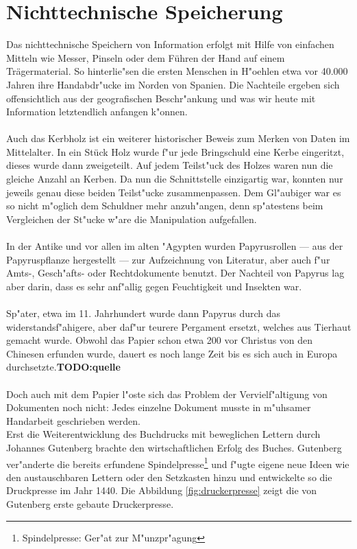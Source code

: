 
\chapter{Nichttechnische Speicherung}
\label{ch:Nichttechnische Speicherung}
Das nichttechnische Speichern von Information erfolgt mit Hilfe von einfachen Mitteln wie Messer, Pinseln oder dem Führen der Hand auf einem Trägermaterial. So hinterlie"sen die ersten Menschen in H"oehlen etwa vor 40.000 Jahren ihre Handabdr"ucke im Norden von Spanien\cite{spiegel:hoehle}. Die Nachteile ergeben sich offensichtlich aus der geografischen Beschr"ankung und was wir heute mit Information letztendlich anfangen k"onnen.
\\
\\
Auch das Kerbholz ist ein weiterer historischer Beweis zum Merken von Daten im Mittelalter. In ein Stück Holz wurde f"ur jede Bringschuld eine Kerbe eingeritzt, dieses wurde dann zweigeteilt. Auf jedem Teilst"uck des Holzes waren nun die gleiche Anzahl an Kerben. Da nun die Schnittstelle einzigartig war, konnten nur jeweils genau diese beiden Teilst"ucke zusammenpassen. Dem Gl"aubiger war es so nicht m"oglich dem Schuldner mehr anzuh"angen, denn sp"atestens beim Vergleichen der St"ucke w"are die Manipulation aufgefallen.\cite{carlen:kerbholz} 
\\
\\
In der Antike und vor allen im alten "Agypten wurden Papyrusrollen --- aus der Papyruspflanze hergestellt --- zur Aufzeichnung von Literatur, aber auch f"ur Amts-, Gesch"afts- oder Rechtdokumente benutzt. Der Nachteil von Papyrus lag aber darin, dass es sehr anf"allig gegen Feuchtigkeit und Insekten war.
\\
\\
Sp"ater, etwa im 11. Jahrhundert wurde dann Papyrus durch das widerstandsf"ahigere, aber daf"ur teurere Pergament ersetzt, welches aus Tierhaut gemacht wurde.
Obwohl das Papier schon etwa 200 vor Christus von den Chinesen erfunden wurde, dauert es noch lange Zeit bis es sich auch in Europa durchsetzte.\textbf{TODO:quelle}
\\
\\
Doch auch mit dem Papier l"oste sich das Problem der Vervielf"altigung von Dokumenten noch nicht: 
Jedes einzelne Dokument musste in m"uhsamer Handarbeit geschrieben werden. 
\\
Erst die Weiterentwicklung des Buchdrucks mit beweglichen Lettern durch Johannes Gutenberg brachte den wirtschaftlichen Erfolg des Buches.
Gutenberg ver"anderte die bereits erfundene Spindelpresse\footnote[3]{Spindelpresse: Ger"at zur M"unzpr"agung} und f"ugte eigene neue Ideen wie den austauschbaren Lettern oder den Setzkasten hinzu und entwickelte so die Druckpresse im Jahr 1440. Die Abbildung \ref{fig:druckerpresse} zeigt die von Gutenberg erste gebaute Druckerpresse.


